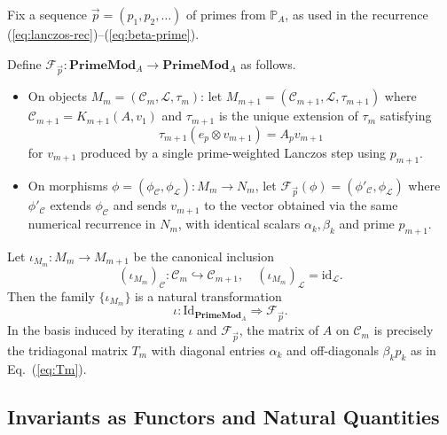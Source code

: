 \documentclass[11pt]{article}
\begin{document}
Fix a sequence $\vec{p}=(p_1,p_2,\dots)$ of primes from
$\mathbb{P}_A$, as used in the recurrence
(\ref{eq:lanczos-rec})--(\ref{eq:beta-prime}).\cite{PrimeEigenSolvers}

\begin{definition}
Define $\mathcal{F}_{\vec{p}} : \mathbf{PrimeMod}_A \to
\mathbf{PrimeMod}_A$ as follows.
\begin{itemize}
  \item On objects $M_m =
    (\mathcal{C}_m,\mathcal{L},\tau_m)$: let $M_{m+1} =
    (\mathcal{C}_{m+1},\mathcal{L},\tau_{m+1})$ where
    $\mathcal{C}_{m+1}=K_{m+1}(A,v_1)$ and $\tau_{m+1}$ is the unique
    extension of $\tau_m$ satisfying
    \[
    \tau_{m+1}(e_p\otimes v_{m+1}) = A_p v_{m+1}
    \]
    for $v_{m+1}$ produced by a single prime-weighted Lanczos step
    using $p_{m+1}$.\cite{PrimeEigenSolvers}
  \item On morphisms
    $\phi=(\phi_{\mathcal{C}},\phi_{\mathcal{L}}) :
    M_m \to N_m$, let
    $\mathcal{F}_{\vec{p}}(\phi)=(\phi'_{\mathcal{C}},\phi_{\mathcal{L}})$
    where $\phi'_{\mathcal{C}}$ extends $\phi_{\mathcal{C}}$ and sends
    $v_{m+1}$ to the vector obtained via the same numerical recurrence
    in $N_m$, with identical scalars
    $\alpha_k,\beta_k$ and prime $p_{m+1}$.\cite{PrimeEigenSolvers,LanczosSLEPc}
\end{itemize}
\end{definition}

\begin{proposition}
Let $\iota_{M_m} : M_m \to M_{m+1}$ be the canonical inclusion
\[
(\iota_{M_m})_{\mathcal{C}} : \mathcal{C}_m\hookrightarrow\mathcal{C}_{m+1},\quad
(\iota_{M_m})_{\mathcal{L}} = \mathrm{id}_{\mathcal{L}}.
\]
Then the family $\{\iota_{M_m}\}$ is a natural transformation
\[
\iota : \mathrm{Id}_{\mathbf{PrimeMod}_A} \Rightarrow \mathcal{F}_{\vec{p}}.
\]
In the basis induced by iterating $\iota$ and $\mathcal{F}_{\vec{p}}$,
the matrix of $A$ on $\mathcal{C}_m$ is precisely the tridiagonal
matrix $T_m$ with diagonal entries $\alpha_k$ and off-diagonals
$\beta_k p_k$ as in Eq.~(\ref{eq:Tm}).\cite{PrimeEigenSolvers,LanczosSLEPc}
\end{proposition}

\subsection{Invariants as Functors and Natural Quantities}
\end{document}
